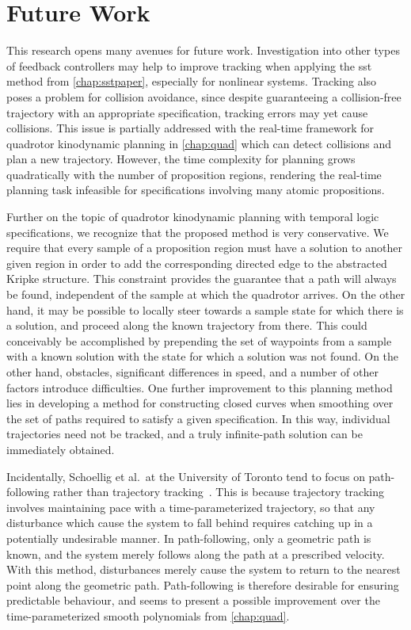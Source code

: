 \section{Future Work}


This research opens many avenues for future work. Investigation into other types of feedback controllers may help to improve tracking when applying the \gls{sst} method from \autoref{chap:sstpaper}, especially for nonlinear systems. Tracking also poses a problem for collision avoidance, since despite guaranteeing a collision-free trajectory with an appropriate \mucalc{} specification, tracking errors may yet cause collisions. This issue is partially addressed with the real-time framework for quadrotor kinodynamic planning in \autoref{chap:quad} which can detect collisions and plan a new trajectory. However, the time complexity for planning grows quadratically with the number of proposition regions, rendering the real-time planning task infeasible for specifications involving many atomic propositions.

Further on the topic of quadrotor kinodynamic planning with temporal logic specifications, we recognize that the proposed method is very conservative. We require that every sample of a proposition region must have a solution to another given region in order to add the corresponding directed edge to the abstracted Kripke structure. This constraint provides the guarantee that a path will always be found, independent of the sample at which the quadrotor arrives. On the other hand, it may be possible to locally steer towards a sample state for which there is a solution, and proceed along the known trajectory from there. This could conceivably be accomplished by prepending the set of waypoints from a sample with a known solution with the state for which a solution was not found. On the other hand, obstacles, significant differences in speed, and a number of other factors introduce difficulties. One further improvement to this planning method lies in developing a method for constructing closed curves when smoothing over the set of paths required to satisfy a given specification. In this way, individual trajectories need not be tracked, and a truly infinite-path solution can be immediately obtained.

Incidentally, Schoellig et al.\ at the University of Toronto tend to focus on path-following rather than trajectory tracking~\cite{Greeff2018,Ostafew2015}. This is because trajectory tracking involves maintaining pace with a time-parameterized trajectory, so that any disturbance which cause the system to fall behind requires catching up in a potentially undesirable manner. In path-following, only a geometric path is known, and the system merely follows along the path at a prescribed velocity. With this method, disturbances merely cause the system to return to the nearest point along the geometric path. Path-following is therefore desirable for ensuring predictable behaviour, and seems to present a possible improvement over the time-parameterized smooth polynomials from \autoref{chap:quad}.

